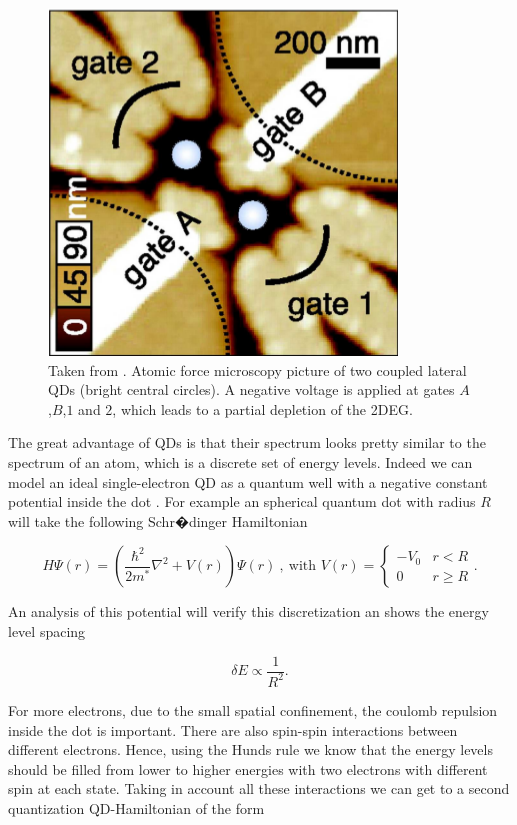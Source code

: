 \begin{figure}[h]
\centering
\includegraphics[scale=0.55]{IMAGES/QD-horizontal.png}\caption{Taken from \citep{holleitner_probing_2002}. Atomic force microscopy
picture of two coupled lateral QDs (bright central circles). A negative
voltage is applied at gates $A$,$B$,$1$ and $2$, which leads to
a partial depletion of the 2DEG.\label{QD}}
\end{figure}


The great advantage of QDs is that their spectrum looks pretty similar
to the spectrum of an atom, which is a discrete set of energy levels.
Indeed we can model an ideal single-electron QD as a quantum well
with a negative constant potential inside the dot . For example an
spherical quantum dot with radius $R$ will take the following Schr�dinger
Hamiltonian 

\[
H\Psi(r)=\left(\frac{\hbar^{2}}{2m^{*}}\nabla^{2}+V(r)\right)\Psi(r)\ ,\ \textrm{with }V(r)=\begin{cases}
-V_{0} & r<R\\
0 & r\geq R
\end{cases}.
\]


An analysis of this potential will verify this discretization an shows
the energy level spacing \citep[Equation (5.44)]{bimberg_quantum_1999}

\[
\delta E\propto\frac{1}{R^{2}}.
\]


For more electrons, due to the small spatial confinement, the coulomb
repulsion inside the dot is important. There are also spin-spin interactions
between different electrons. Hence, using the Hunds rule we know that
the energy levels should be filled from lower to higher energies with
two electrons with different spin at each state. Taking in account
all these interactions we can get to a second quantization QD-Hamiltonian
of the form \citep[(3.2)]{sindel_numerical_2005}

